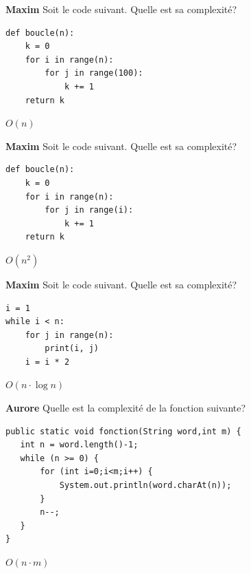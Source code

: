 

\begin{Exercice}[5 minutes]\textbf{Maxim}
Soit le code suivant. Quelle est sa complexité?

\begin{lstlisting}[style=pythonstyle]
def boucle(n):
    k = 0
    for i in range(n):
        for j in range(100):
            k += 1
    return k
\end{lstlisting}


\begin{solution}
$O(n)$
\end{solution}

\end{Exercice}


\begin{Exercice}[5 minutes]\textbf{Maxim}
Soit le code suivant. Quelle est sa complexité?

\begin{lstlisting}[style=pythonstyle]
def boucle(n):
    k = 0
    for i in range(n):
        for j in range(i):
            k += 1
    return k
\end{lstlisting}


\begin{solution}
$O(n^2)$
\end{solution}

\end{Exercice}


\begin{Exercice}[5 minutes]\textbf{Maxim}
Soit le code suivant. Quelle est sa complexité?

\begin{lstlisting}[style=pythonstyle]
i = 1
while i < n:
    for j in range(n):
        print(i, j)
    i = i * 2
\end{lstlisting}


\begin{solution}
$O(n\cdot \log n)$
\end{solution}

\end{Exercice}

\begin{Exercice}[5 minutes]\textbf{Aurore}
Quelle est la complexité de la fonction suivante?

\begin{lstlisting}[style=javastyle]
public static void fonction(String word,int m) {
   int n = word.length()-1;
   while (n >= 0) {
       for (int i=0;i<m;i++) {
           System.out.println(word.charAt(n));
       }
       n--;
   }
}
\end{lstlisting}


\begin{solution}
$O(n\cdot m)$
\end{solution}

\end{Exercice}

